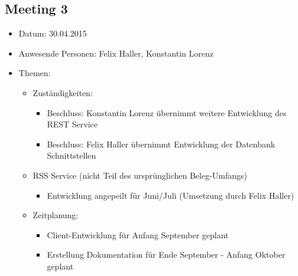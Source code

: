 \documentclass[12pt]{scrartcl}
\begin{document}
		\subsection{Meeting 3}
		\begin{itemize}
			\item Datum: 30.04.2015
			\item Anwesende Personen: Felix Haller, Konstantin Lorenz
			\item Themen:
			\begin{itemize}
				\item Zuständigkeiten:
				\begin{itemize}
					\item Beschluss: Konstantin Lorenz übernimmt weitere Entwicklung des REST Service
					\item Beschluss: Felix Haller übernimmt Entwicklung der Datenbank Schnittstellen
				\end{itemize}
				\item RSS Service (nicht Teil des ursprünglichen Beleg-Umfangs)
				\begin{itemize}
					\item Entwicklung angepeilt für Juni/Juli (Umsetzung durch Felix Haller)
				\end{itemize}
				\item Zeitplanung:
				\begin{itemize}
					\item Client-Entwicklung für Anfang September geplant
					\item Erstellung Dokumentation für Ende September - Anfang Oktober geplant
				\end{itemize}
			\end{itemize}
		\end{itemize}
		
\end{document}

